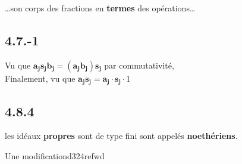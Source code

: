 \documentclass[11pt]{article}
\begin{document}
\dots son corps des fractions en \textbf{termes} des opérations\dots

\subsection*{4.7.-1}
Vu que $\pmb{a_js_jb_j = (a_jb_j)s_j}$ par commutativité, 
\\
 Finalement, vu que $\pmb{a_js_j = a_j \cdot s_j} \cdot 1$

\subsection*{4.8.4}

 les idéaux \textbf{propres} sont de type fini sont appelés \textbf{noethériens}.
 
Une modificationd324refwd


 	
\end{document}
